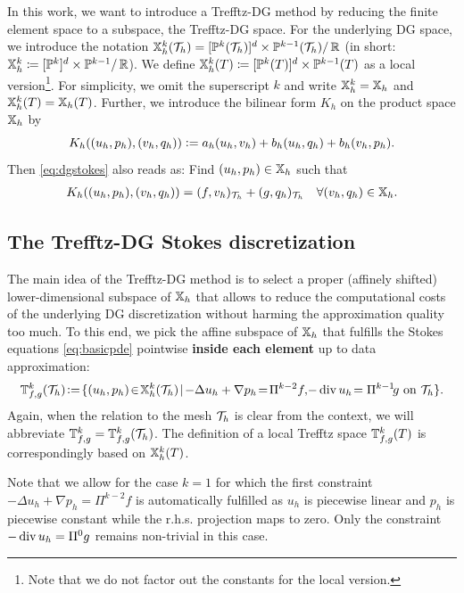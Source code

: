 \documentclass[pdflatex,sn-mathphys,Numbered]{sn-jnl}%
\theoremstyle{remark}%
\theoremstyle{definition}%
\begin{document}
In this work, we want to introduce a Trefftz-DG method by reducing the
finite element space to a subspace, the Trefftz-DG space. For the
underlying DG space, we introduce the notation $\mathbb{X}^k_h({\mathcal{T}_h}) =
[\mathbb{P}^k({\mathcal{T}_h})]^d \times \mathbb{P}^{k-1}({\mathcal{T}_h}) /\, \mathbb{R}$ (in short:
$\mathbb{X}^k_h \coloneqq [\mathbb{P}^k]^d \times \mathbb{P}^{k-1}/\,\mathbb{R}$). We define $\mathbb{X}^k_h(T) \coloneqq [\mathbb{P}^k(T)]^d \times
\mathbb{P}^{k-1}(T)$ as a local version\footnote{Note that we do not factor out the constants for the local version.}. 
For simplicity, we omit the superscript $k$ and write
$\mathbb{X}^k_h = \mathbb{X}_h$ and $\mathbb{X}^k_h(T) = \mathbb{X}_h(T)$. Further, we introduce the
bilinear form $K_h$ on the product space $\mathbb{X}_h$ by
\begin{equation} \label{eq:K}
  K_h((u_h,p_h),(v_h,q_h)) := a_h(u_h,v_h) + b_h(u_h,q_h) + b_h(v_h,p_h).
\end{equation}
Then \eqref{eq:dgstokes} also reads as: Find $(u_h,p_h) \in \mathbb{X}_h$ such that
\begin{align} \label{eq:DGK}
  K_h((u_h,p_h),(v_h,q_h)) = (f,v_h)_{{\mathcal{T}_h}} + (g,q_h)_{{\mathcal{T}_h}} \quad \forall (v_h,q_h) \in \mathbb{X}_h.
\end{align}

\subsection{The Trefftz-DG Stokes discretization}
The main idea of the Trefftz-DG method is to select a proper (affinely
shifted) lower-dimensional subspace of $\mathbb{X}_h$ that allows to reduce
the computational costs of the underlying DG discretization without
harming the approximation quality too much. To this end, we pick the
affine subspace of $\mathbb{X}_h$ that fulfills the Stokes equations
\eqref{eq:basicpde} pointwise \textbf{inside each element} up to data
approximation:
\begin{equation}\label{eq:Trefftzconditions}
  \TT^k_{f,g}(\Th) \!:=\! \{ (u_h,p_h) \!\in\! \X^k_h(\Th) \!\mid\!   -\Delta u_{h} + \nabla p_{h}\!=\!\Pi^{k-2} f, \!-\Div u_{h} \!= \Pi^{k-1}\! g \text{ on } \Th\}. 
\end{equation}
Again, when the relation to the mesh ${\mathcal{T}_h}$ is clear from the context, we will abbreviate $\mathbb{T}^k_{f,g} = \mathbb{T}^k_{f,g}({\mathcal{T}_h})$. The definition of a local Trefftz space $\mathbb{T}^k_{f,g}(T)$ is correspondingly based on $\mathbb{X}^k_h(T)$.

Note that we allow for the case $k=1$ for which the first constraint $-\Delta u_{h} + \nabla p_{h} = \Pi^{k-2} f$ is automatically fulfilled as $u_h$ is piecewise linear and $p_h$ is piecewise constant while the r.h.s. projection maps to zero. Only the constraint $- \operatorname{\mathrm{div}} u_h = \Pi^0 g$ remains non-trivial in this case.
\end{document}
